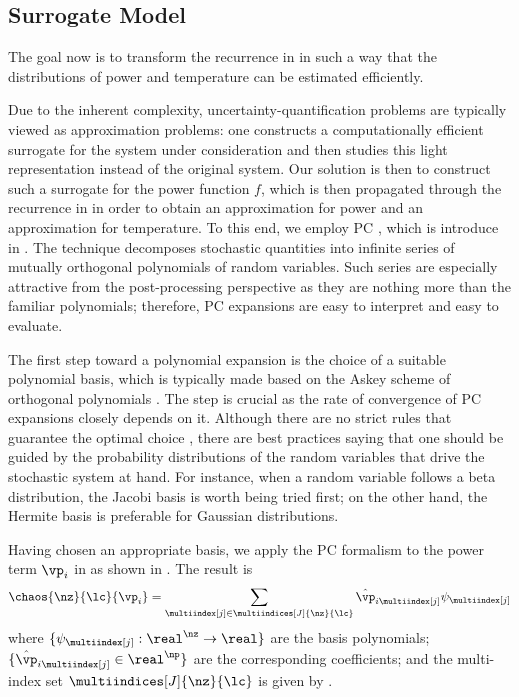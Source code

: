 \subsection{Surrogate Model}

The goal now is to transform the recurrence in 
in such a way that the distributions of power and temperature can be estimated
efficiently.

Due to the inherent complexity, uncertainty-quantification problems are
typically viewed as approximation problems: one constructs a computationally
efficient surrogate for the system under consideration and then studies this
light representation instead of the original system. Our solution is then to
construct such a surrogate for the power function $f$, which is then propagated
through the recurrence in  in order to obtain an
approximation for power and an approximation for temperature. To this end, we
employ \acf{PC} \cite{xiu2010}, which is introduce in .
The technique decomposes stochastic quantities into infinite series of mutually
orthogonal polynomials of random variables. Such series are especially
attractive from the post-processing perspective as they are nothing more than
the familiar polynomials; therefore, \ac{PC} expansions are easy to interpret
and easy to evaluate.

The first step toward a polynomial expansion is the choice of a suitable
polynomial basis, which is typically made based on the Askey scheme of
orthogonal polynomials \cite{xiu2010}. The step is crucial as the rate of
convergence of \ac{PC} expansions closely depends on it. Although there are no
strict rules that guarantee the optimal choice \cite{knio2006}, there are best
practices saying that one should be guided by the probability distributions of
the random variables that drive the stochastic system at hand. For instance,
when a random variable follows a beta distribution, the Jacobi basis is worth
being tried first; on the other hand, the Hermite basis is preferable for
Gaussian distributions.

Having chosen an appropriate basis, we apply the \ac{PC} formalism to the power
term $\vp_i$ in  as shown in
. The result is
\[
  \chaos{\nz}{\lc}{\vp_i} = \sum_{\multiindex[j] \in \multiindices[J]{\nz}{\lc}} \hat{\vp}_{i \multiindex[j]} \psi_{\multiindex[j]}
\]
where $\{ \psi_{\multiindex[j]}: \real^\nz \to \real \}$ are the basis
polynomials; $\{ \hat{\vp}_{i \multiindex[j]} \in \real^\np \}$ are the
corresponding coefficients; and the multi-index set $\multiindices[J]{\nz}{\lc}$
is given by .

